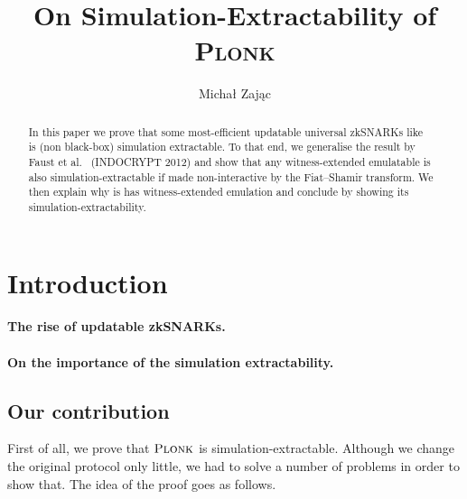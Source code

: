 \documentclass[runningheads,11pt]{llncs}
\title{On Simulation-Extractability of \textsc{Plonk}}
\author{Michał Zając}
\institute{Clearmatics, London, UK\\ \email{m.p.zajac@gmail.com}}
\theoremstyle{definition}
\begin{document}
	\sloppy
	\maketitle

\begin{abstract}
	In this paper we prove that some most-efficient updatable universal zkSNARKs like \plonk{}~\cite{EPRINT:GabWilCio19}  is (non black-box) simulation extractable.
	To that end, we generalise the result by Faust et al.~\cite{INDOCRYPT:FKMV12} (INDOCRYPT 2012) and show that any witness-extended emulatable is also simulation-extractable if made non-interactive by the Fiat--Shamir transform. We then explain why \plonk{} is has witness-extended emulation and conclude by showing its simulation-extractability.
\end{abstract}

\section{Introduction}
\paragraph{The rise of updatable zkSNARKs.}
\cite{C:GKMMM18}
\cite{EC:CHMMVW20}
\cite{CCS:MBKM19}
\cite{EPRINT:GabWilCio19}
\cite{EPRINT:Gabizon19c}
\cite{EPRINT:Lipmaa19a}

\paragraph{On the importance of the simulation extractability.}
\cite{AC:DHLW10}
\cite{AC:Groth07}
\cite{EPRINT:AbdRamSla20}
\cite{EPRINT:KZMQCP15}
\cite{EPRINT:AtaBag19}

\subsection{Our contribution}
First of all, we prove that $\textsc{Plonk}$ is simulation-extractable. Although we change the original protocol only little, we had to solve a number of problems in order to show that. The idea of the proof goes as follows.
\end{document}
